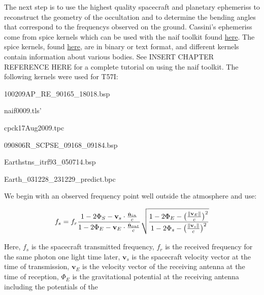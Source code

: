 \documentclass{article}
\theoremstyle{mystyle}
\begin{document}
The next step is to use the highest quality spacecraft and planetary \glspl{ephemeris} to reconstruct the geometry of the \gls{occultation} and to determine the \glspl{bending angle} that correspond to the \glspl{frequency} observed on the ground. Cassini's \glspl{ephemeris} come from \gls{spice} \glspl{kernel} which can be used with the \gls{naif} toolkit found \href{ftp://naif.jpl.nasa.gov/pub/naif/toolkit}{here}. The \gls{spice} \glspl{kernel}, found \href{ftp://naif.jpl.nasa.gov/pub/naif/CASSINI/kernels}{here}, are in binary or text format, and different \glspl{kernel} contain information about various bodies. See INSERT CHAPTER REFERENCE HERE for a complete tutorial on using the \gls{naif} toolkit. The following \glspl{kernel} were used for T57I:

\begin{itemize}[itemsep=0pt]
\begin{multicols}{2}
    \item 100209AP\_RE\_90165\_18018.bsp
    \item naif0009.tls'
    \item cpck17Aug2009.tpc
    \item 090806R\_SCPSE\_09168\_09184.bsp
    \item Earthstns\_itrf93\_050714.bsp
    \item Earth\_031228\_231229\_predict.bpc
\end{multicols}
\end{itemize}

\noindent We begin with an observed frequency point well outside the atmosphere and use:

\begin{equation}
f_{s} = f_{r}\frac{1-2\Phi_{S}-\mathbf{v}_{s}\cdot \frac{\hat{\mathbf{n}}_{in}}{c}}{1-2\Phi_{E}-\mathbf{v}_{E}\cdot \frac{\hat{\mathbf{n}}_{out}}{c}}\sqrt{\frac{1-2\Phi_{E} - \big(\frac{\norm{\mathbf{v}_{E}}}{c}\big)^2}{1-2\Phi_{s}-\big(\frac{\norm{\mathbf{v}_{s}}}{c}\big)^2}}
\end{equation}

\noindent Here, $f_s$ is the spacecraft transmitted frequency, $f_r$ is the received frequency for the same photon one light time later, $\mathbf{v}_s$ is the spacecraft velocity vector at the time of transmission, $\mathbf{v}_{E}$ is the velocity vector of the receiving antenna at the time of reception, $\Phi_{E}$ is the gravitational potential at the receiving antenna including the potentials of the 
\end{document}
